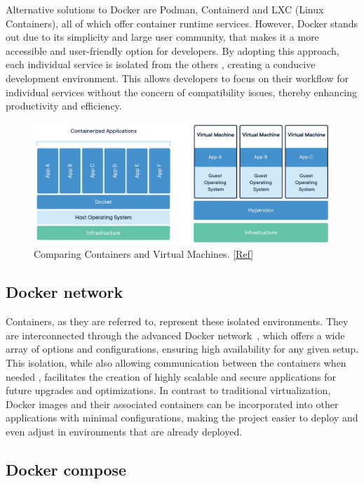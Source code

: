 Alternative solutions to Docker are Podman, Containerd and LXC (Linux Containers), all of which offer container runtime services. However, Docker stands out due to its simplicity and large user community, that makes it a more accessible and user-friendly option for developers. By adopting this approach, each individual service is isolated from the others , creating a conducive development environment. This allows developers to focus on their workflow for individual services without the concern of compatibility issues, thereby enhancing productivity and efficiency.

\begin{figure}[htbp]
	\includegraphics[width=0.75\linewidth]{figures/docker-containerized-and-vm-transparent-bg.png.jpg}
	\centering
	\caption{Comparing Containers and Virtual Machines. \href{https://www.docker.com/resources/what-container/}{[Ref]}}
	\label{ComparingContainersandVirtualMachines}
\end{figure}

\subsection{Docker network}

Containers, as they are referred to, represent these isolated environments. They are interconnected through the advanced Docker network~\cite{DockerNetwork}, which offers a wide array of options and configurations, ensuring high availability for any given setup. This isolation, while also allowing communication between the containers when needed , facilitates the creation of highly scalable and secure applications for future upgrades and optimizations. In contrast to traditional virtualization, Docker images and their associated containers can be incorporated into other applications with minimal configurations, making the project easier to deploy and even adjust in environments that are already deployed.

\subsection{Docker compose}

